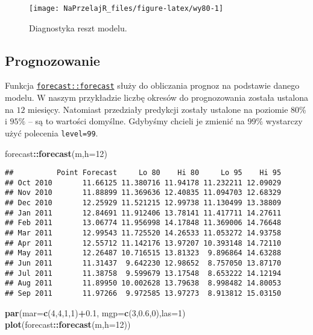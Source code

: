 \documentclass[polish,]{book}
\newenvironment{Shaded}{\begin{snugshade}}{\end{snugshade}}
\newcommand{\DataTypeTok}[1]{\textcolor[rgb]{0.13,0.29,0.53}{#1}}
\newcommand{\DecValTok}[1]{\textcolor[rgb]{0.00,0.00,0.81}{#1}}
\newcommand{\FloatTok}[1]{\textcolor[rgb]{0.00,0.00,0.81}{#1}}
\newcommand{\KeywordTok}[1]{\textcolor[rgb]{0.13,0.29,0.53}{\textbf{#1}}}
\newcommand{\NormalTok}[1]{#1}
\newcommand{\OperatorTok}[1]{\textcolor[rgb]{0.81,0.36,0.00}{\textbf{#1}}}
\begin{document}
\begin{figure}[h]

{\centering \texttt{[image: NaPrzelajR\_files/figure-latex/wy80-1]} 

}

\caption{Diagnostyka reszt modelu.}\label{fig:wy80}
\end{figure}

\hypertarget{part_733}{%
\subsection{Prognozowanie}\label{part_733}}

Funkcja \href{https://rdrr.io/cran/forecast/man/forecast.html}{\texttt{forecast::forecast}} służy do obliczania prognoz na podstawie danego
modelu. W naszym przykładzie liczbę okresów do prognozowania została ustalona
na \(12\) miesięcy. Natomiast przedziały predykcji zostały ustalone na poziomie 80\%
i \(95\%\) -- są to wartości domyślne. Gdybyśmy chcieli je zmienić na \(99\%\) wystarczy użyć polecenia \texttt{level=99}.

\begin{Shaded}
\begin{Highlighting}[]
\NormalTok{forecast}\OperatorTok{::}\KeywordTok{forecast}\NormalTok{(m,}\DataTypeTok{h=}\DecValTok{12}\NormalTok{)}
\end{Highlighting}
\end{Shaded}

\begin{verbatim}
##          Point Forecast     Lo 80    Hi 80     Lo 95    Hi 95
## Oct 2010       11.66125 11.380716 11.94178 11.232211 12.09029
## Nov 2010       11.88899 11.369636 12.40835 11.094703 12.68329
## Dec 2010       12.25929 11.521215 12.99738 11.130499 13.38809
## Jan 2011       12.84691 11.912406 13.78141 11.417711 14.27611
## Feb 2011       13.06774 11.956998 14.17848 11.369006 14.76648
## Mar 2011       12.99543 11.725520 14.26533 11.053272 14.93758
## Apr 2011       12.55712 11.142176 13.97207 10.393148 14.72110
## May 2011       12.26487 10.716515 13.81323  9.896864 14.63288
## Jun 2011       11.31437  9.642230 12.98652  8.757050 13.87170
## Jul 2011       11.38758  9.599679 13.17548  8.653222 14.12194
## Aug 2011       11.89950 10.002628 13.79638  8.998482 14.80053
## Sep 2011       11.97266  9.972585 13.97273  8.913812 15.03150
\end{verbatim}

\begin{Shaded}
\begin{Highlighting}[]
\KeywordTok{par}\NormalTok{(}\DataTypeTok{mar=}\KeywordTok{c}\NormalTok{(}\DecValTok{4}\NormalTok{,}\DecValTok{4}\NormalTok{,}\DecValTok{1}\NormalTok{,}\DecValTok{1}\NormalTok{)}\OperatorTok{+}\FloatTok{0.1}\NormalTok{, }\DataTypeTok{mgp=}\KeywordTok{c}\NormalTok{(}\DecValTok{3}\NormalTok{,}\FloatTok{0.6}\NormalTok{,}\DecValTok{0}\NormalTok{),}\DataTypeTok{las=}\DecValTok{1}\NormalTok{)}
\KeywordTok{plot}\NormalTok{(forecast}\OperatorTok{::}\KeywordTok{forecast}\NormalTok{(m,}\DataTypeTok{h=}\DecValTok{12}\NormalTok{))}
\end{Highlighting}
\end{Shaded}
\end{document}
